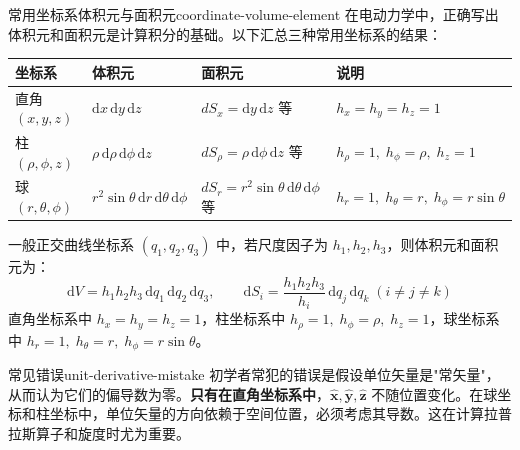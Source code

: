 \documentclass[11pt,a4paper,openany,oneside]{book}
\newcommand{\diff}{\mathrm{d}}
\newcommand{\vect}[1]{\bm{#1}}
\newcommand{\unitvec}[1]{\hat{\vect{#1}}}
\begin{document}
\begin{review}{常用坐标系体积元与面积元}{coordinate-volume-element}
在电动力学中，正确写出体积元和面积元是计算积分的基础。以下汇总三种常用坐标系的结果：

\begin{center}
\small
\setlength{\tabcolsep}{2pt}
\begin{tabular}{@{}llll@{}}
\toprule
\textbf{坐标系} & \textbf{体积元} & \textbf{面积元} & \textbf{说明} \\
\midrule
直角 $(x,y,z)$ & $\diff x\,\diff y\,\diff z$ & $dS_x=\diff y\,\diff z$ 等 & $h_x=h_y=h_z=1$ \\
\addlinespace
柱 $(\rho,\phi,z)$ & $\rho\,\diff\rho\,\diff\phi\,\diff z$ & $dS_\rho=\rho\,\diff\phi\,\diff z$ 等 & $h_\rho=1,\;h_\phi=\rho,\;h_z=1$ \\
\addlinespace
球 $(r,\theta,\phi)$ & $r^2\sin\theta\,\diff r\,\diff\theta\,\diff\phi$ & $dS_r=r^2\sin\theta\,\diff\theta\,\diff\phi$ 等 & $h_r=1,\;h_\theta=r,\;h_\phi=r\sin\theta$ \\
\bottomrule
\end{tabular}
\end{center}

一般正交曲线坐标系 $(q_1,q_2,q_3)$ 中，若尺度因子为 $h_1,h_2,h_3$，则体积元和面积元为：
\[
\diff V = h_1 h_2 h_3 \,\diff q_1\,\diff q_2\,\diff q_3, \qquad
\diff S_i = \frac{h_1 h_2 h_3}{h_i}\,\diff q_j\,\diff q_k \;(i\neq j\neq k)
\]
直角坐标系中 $h_x=h_y=h_z=1$，柱坐标系中 $h_\rho=1,\;h_\phi=\rho,\;h_z=1$，球坐标系中 $h_r=1,\;h_\theta=r,\;h_\phi=r\sin\theta$。
\end{review}

\begin{warning}{常见错误}{unit-derivative-mistake}
初学者常犯的错误是假设单位矢量是"常矢量"，从而认为它们的偏导数为零。\textbf{只有在直角坐标系中}，$\unitvec{x}, \unitvec{y}, \unitvec{z}$ 不随位置变化。在球坐标和柱坐标中，单位矢量的方向依赖于空间位置，必须考虑其导数。这在计算拉普拉斯算子和旋度时尤为重要。
\end{warning}
\end{document}

